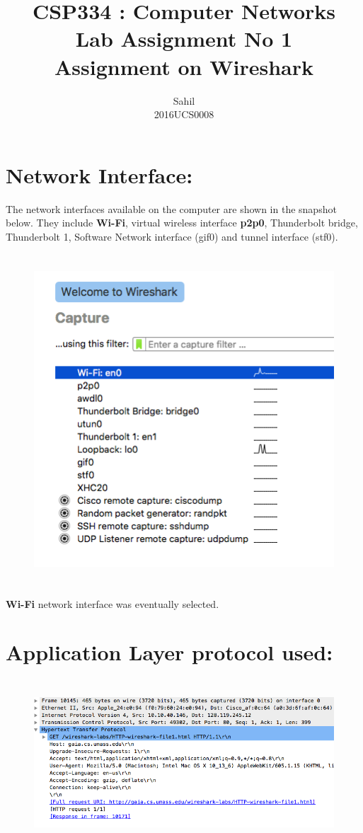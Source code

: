 \documentclass[]{report}
\title{\centering CSP334 : Computer Networks \\Lab Assignment No 1\\Assignment on Wireshark}
\author{\LARGE Sahil\\2016UCS0008}
\begin{document}
\maketitle

\section{Network Interface:}
The network interfaces available on the computer are shown in the snapshot below. They include \textbf{Wi-Fi}, virtual wireless interface \textbf{p2p0}, Thunderbolt bridge, Thunderbolt 1, Software Network interface (gif0) and tunnel interface (stf0).
\begin{figure}[H]
	\vspace{0pt}
	\includegraphics[height = 350pt, keepaspectratio]{Snapshots/q1.png}
\end{figure}
\textbf{Wi-Fi} network interface was eventually selected.

\section{Application Layer protocol used:}

\begin{figure}[H]
	\vspace{0pt}
	\includegraphics[height = 175pt, keepaspectratio]{Snapshots/q2.png}
\end{figure}
\end{document}
